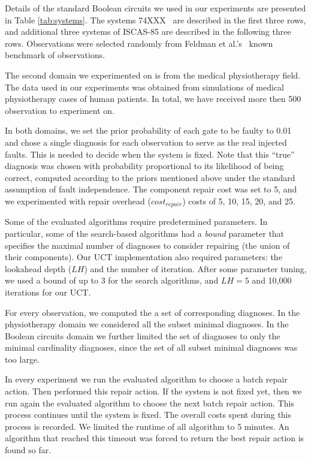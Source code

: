 \documentclass[a4paper,11pt]{report}
\newcommand{\shortcite}{\cite}
\begin{document}
Details of the standard Boolean circuits we used in our experiments are presented in Table \ref{tab:systems}. The systems {\small 74XXX}~\cite{Hansen99} are described in the first three rows, and additional three systems of {\small ISCAS-85} \cite{Brglez89} are described in the following three rows. Observations were selected randomly from Feldman et al.'s~\shortcite{feldman2010approximate} known benchmark of observations.

The second domain we experimented on is from the medical physiotherapy field. The data used in our experiments was obtained from simulations of medical physiotherapy cases of human patients. In total, we have received more then 500 observation to experiment on. 



In both domains, we set the prior probability of each gate to be faulty to 0.01 and chose a single diagnosis for each observation to serve as the real injected faults. This is needed to decide when the system is fixed. Note that this ``true'' diagnosis was chosen with probability proportional to its likelihood of being correct, computed according to the priors mentioned above under the standard assumption of fault independence. The component repair cost was set to 5, and we experimented with repair overhead ($cost_{repair}$) costs of 5, 10, 15, 20, and 25.

Some of the evaluated algorithms require predetermined parameters. In particular, some of the search-based algorithms had a \emph{bound} parameter that specifies the maximal number of diagnoses to consider repairing (the union of their components). Our UCT implementation also required parameters: the lookahead depth ($LH$) 
and the number of iteration. 
After some parameter tuning, we used a bound of up to 3 for the search algorithms, and $LH=5$ and 10,000 iterations for our UCT. 


For every observation, we computed the a set of corresponding diagnoses. In the physiotherapy domain we considered all the subset minimal diagnoses.  
In the Boolean circuits domain we further limited the set of diagnoses to only the minimal cardinality diagnoses, since the set of all subset minimal diagnoses was too large. 


In every experiment we run the evaluated algorithm to choose a batch repair action. Then performed this repair action. If the system is not fixed yet, then we run again the evaluated algorithm to choose the next batch repair action. This process continues until the system is fixed. The overall costs spent during this process is recorded. We limited the runtime of all algorithm to 5 minutes. 
An algorithm that reached this timeout was forced to return the best repair action is found so far. 
\end{document}
